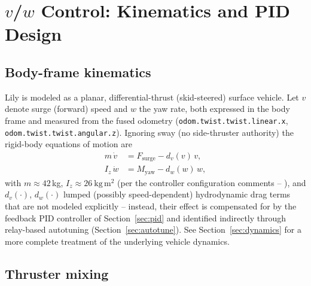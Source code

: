 \section{$v$/$w$ Control: Kinematics and PID Design}
\label{sec:vw}

\begin{center}
\end{center}

\subsection{Body-frame kinematics}

Lily is modeled as a planar, differential-thrust (skid-steered) surface vehicle. Let $v$ denote surge (forward) speed and $w$ the yaw rate, both expressed in the body frame and measured from the fused odometry (\texttt{odom.twist.twist.linear.x}, \texttt{odom.twist.twist.angular.z}). Ignoring sway (no side-thruster authority) the rigid-body equations of motion are
\begin{align}
m\,\dot v  &= F_{\text{surge}} - d_v(v)\,v, \label{eq:surgeeom}\\
I_z\,\dot w &= M_{\text{yaw}} - d_w(w)\,w, \label{eq:yaweom}
\end{align}
with $m\approx 42$\,kg, $I_z \approx 26\ \text{kg}\,\text{m}^2$ (per the controller configuration comments -- ), and $d_v(\cdot)$, $d_w(\cdot)$ lumped (possibly speed-dependent) hydrodynamic drag terms that are not modeled explicitly -- instead, their effect is compensated for by the feedback PID controller of Section~\ref{sec:pid} and identified indirectly through relay-based autotuning (Section~\ref{sec:autotune}). See Section~\ref{sec:dynamics} for a more complete treatment of the underlying vehicle dynamics.

\subsection{Thruster mixing}
\label{sec:mixing}

